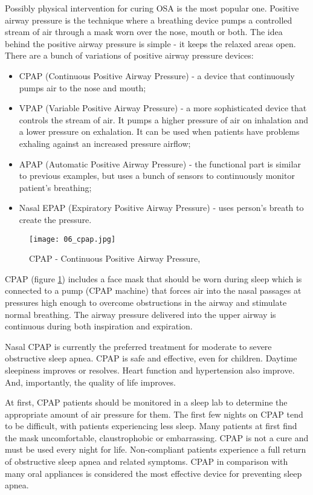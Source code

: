 Possibly physical intervention for curing OSA is the most popular one. Positive airway pressure is the technique where a breathing device pumps a controlled stream of air through a mask worn over the nose, mouth or both. The idea behind the positive airway pressure is simple - it keeps the relaxed areas open.  There are a bunch of variations of positive airway pressure devices:
\begin{itemize}[topsep=5pt, partopsep=0pt,itemsep=3pt,parsep=1pt]
 \item CPAP (Continuous Positive Airway Pressure) - a device that continuously pumps air to the nose and mouth;
 \item VPAP (Variable Positive Airway Pressure) - a more sophisticated device that controls the stream of air. It pumps a higher pressure of air on inhalation and a lower pressure on exhalation. It can be used when patients have problems exhaling against an increased pressure airflow;
 \item APAP (Automatic Positive Airway Pressure) - the functional part is similar to previous examples, but uses a bunch of sensors to continuously monitor patient's breathing;
 \item Nasal EPAP (Expiratory Positive Airway Pressure) - uses person's breath to create the pressure.
\end{itemize}

\begin{figure}[!ht]
\centering
  \texttt{[image: 06\_cpap.jpg]}
\caption{CPAP - Continuous Positive Airway Pressure, \cite{cpap}}
\label{fig:cpap}
\end{figure}

CPAP (figure \ref{fig:cpap}) includes a face mask that should be worn during sleep which is connected to a pump (CPAP machine) that forces air into the nasal passages at pressures high enough to overcome obstructions in the airway and stimulate normal breathing. The airway pressure delivered into the upper airway is continuous during both inspiration and expiration.

Nasal CPAP is currently the preferred treatment for moderate to severe obstructive sleep apnea. CPAP is safe and effective, even for children. Daytime sleepiness improves or resolves. Heart function and hypertension also improve. And, importantly, the quality of life improves.

At first, CPAP patients should be monitored in a sleep lab to determine the appropriate amount of air pressure for them. The first few nights on CPAP tend to be difficult, with patients experiencing less sleep. Many patients at first find the mask uncomfortable, claustrophobic or embarrassing. CPAP is not a cure and must be used every night for life. Non-compliant patients experience a full return of obstructive sleep apnea and related symptoms. CPAP in comparison with many oral appliances is considered the most effective device for preventing sleep apnea. 

